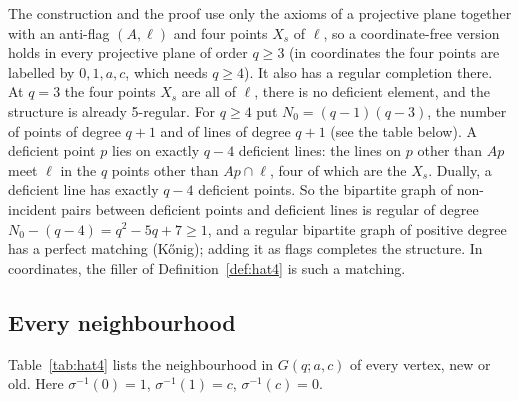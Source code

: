 \documentclass[11pt]{amsart}
\theoremstyle{definition}
\theoremstyle{remark}
\numberwithin{equation}{section}
\begin{document}
The construction and the proof use only the axioms of a projective plane together with an anti-flag $(A,\ell)$ and four
points $X_s$ of $\ell$, so a coordinate-free version holds in every projective plane of order $q\ge3$ (in coordinates
the four points are labelled by $0,1,a,c$, which needs $q\ge4$). It also has a regular completion there. At $q=3$ the
four points $X_s$ are all of $\ell$, there is no deficient element, and the structure is already 5-regular. For $q\ge4$
put $N_0=(q-1)(q-3)$, the number of points of degree $q+1$ and of lines of degree $q+1$ (see the table below). A
deficient point $p$ lies on exactly $q-4$ deficient lines: the lines on $p$ other than $Ap$ meet $\ell$ in the $q$
points other than $Ap\cap\ell$, four of which are the $X_s$. Dually, a deficient line has exactly $q-4$ deficient
points. So the bipartite graph of non-incident pairs between deficient points and deficient lines is regular of degree
$N_0-(q-4)=q^2-5q+7\ge1$, and a regular bipartite graph of positive degree has a perfect matching (K\H{o}nig); adding
it as flags completes the structure. In coordinates, the filler of Definition~\ref{def:hat4} is such a matching.

\subsection{Every neighbourhood}
Table~\ref{tab:hat4} lists the neighbourhood in $G(q;a,c)$ of every vertex, new or old. Here $\sigma^{-1}(0)=1$,
$\sigma^{-1}(1)=c$, $\sigma^{-1}(c)=0$.
\end{document}
